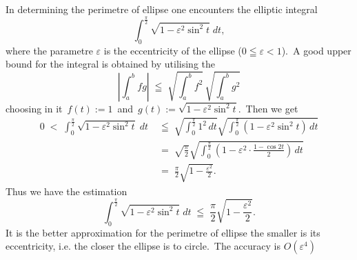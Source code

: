 \documentclass[12pt]{article}
\begin{document}
In determining the perimetre of ellipse one encounters the elliptic integral
$$\int_0^{\frac{\pi}{2}}\!\!\sqrt{1-\varepsilon^2\sin^2t}\;dt,$$
where the parametre $\varepsilon$ is the eccentricity of the ellipse ($0 \leqq \varepsilon < 1$).\, A good upper bound for the integral is obtained by utilising the  
$$\left|\int_a^bfg\right| \;\leqq\; \sqrt{\int_a^bf^2}\,\sqrt{\int_a^bg^2}$$
choosing in it\, $f(t) := 1$\, and\, $g(t) := \sqrt{1-\varepsilon^2\sin^2t}$.\, Then we get
\begin{align*}
0 \;<\; \int_0^{\frac{\pi}{2}}\!\!\sqrt{1-\varepsilon^2\sin^2t}\;dt
&\;\leqq\; \sqrt{\int_0^{\frac{\pi}{2}}1^2\,dt}\sqrt{\int_0^{\frac{\pi}{2}}\left(1-\varepsilon^2\sin^2t\right)\,dt}\\
&\;=\;\sqrt{\frac{\pi}{2}}\sqrt{\int_0^{\frac{\pi}{2}}\left(1-\varepsilon^2\cdot\frac{1-\cos2t}{2}\right)\,dt}\\ 
&\;=\; \frac{\pi}{2}\sqrt{1-\frac{\varepsilon^2}{2}}.
\end{align*}
Thus we have the estimation
$$\int_0^{\frac{\pi}{2}}\!\!\sqrt{1-\varepsilon^2\sin^2t}\;dt
    \;\leqq\; \frac{\pi}{2}\sqrt{1-\frac{\varepsilon^2}{2}}.$$
It is the better approximation for the perimetre of ellipse the smaller is its eccentricity, i.e. the closer the ellipse is to circle.\, The accuracy is $O(\varepsilon^4)$

\end{document}
